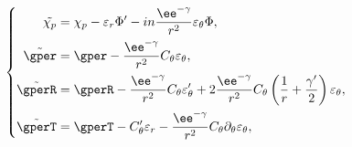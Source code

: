 \begin{equation}
\left\{
\begin{aligned}
\tilde{\chi_p} & = \displaystyle \chi_p - \varepsilon_r \Phi' - i n
\frac{\ee^{-\gamma}}{r^2} \varepsilon_\theta \Phi,\\ \tilde{\gper} & =
\displaystyle \gper -\frac{\ee^{-\gamma}}{r^2} C_\theta
\varepsilon_\theta,\\ \tilde{\gperR} & = \displaystyle \gperR -
\frac{\ee^{-\gamma}}{r^2} C_\theta \varepsilon_{\theta}' + 2
\frac{\ee^{-\gamma}}{r^2} C_\theta \left(\frac{1}{r} +
\frac{\gamma'}{2} \right) \varepsilon_\theta,\\ \tilde{\gperT} & =
\displaystyle \gperT - C_{\theta}' \varepsilon_r -
\frac{\ee^{-\gamma}}{r^2} C_\theta \partial_\theta \varepsilon_\theta,
\end{aligned}
\right.
\end{equation}

